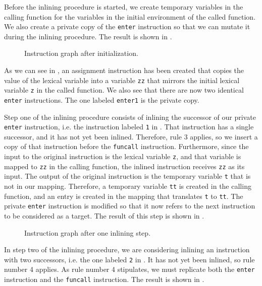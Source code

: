 Before the inlining procedure is started, we create temporary
variables in the calling function for the variables in the initial
environment of the called function.  We also create a private copy of
the \texttt{enter} instruction so that we can mutate it during the
inlining procedure.  The result is shown in .

\begin{figure}
\begin{center}
\end{center}
\caption{\label{fig42}
Instruction graph after initialization.}
\end{figure}

As we can see in , an assignment instruction has been
created that copies the value of the lexical variable into a variable
\texttt{zz} that mirrors the initial lexical variable \texttt{z} in
the called function.  We also see that there are now two identical
\texttt{enter} instructions.  The one labeled \texttt{enter1} is the
private copy.

Step one of the inlining procedure consists of inlining the successor
of our private \texttt{enter} instruction, i.e. the instruction
labeled \texttt{1} in .  That instruction has a single
successor, and it has not yet been inlined.  Therefore, rule 3
applies, so we insert a copy of that instruction before the
\texttt{funcall} instruction.  Furthermore, since the input to the
original instruction is the lexical variable \texttt{z}, and that
variable is mapped to \texttt{zz} in the calling function, the inlined
instruction receives \texttt{zz} as its input.  The output of the
original instruction is the temporary variable \texttt{t} that is not
in our mapping.  Therefore, a temporary variable \texttt{tt} is
created in the calling function, and an entry is created in the
mapping that translates \texttt{t} to \texttt{tt}.  The private
\texttt{enter} instruction is modified so that it now refers to the
next instruction to be considered as a target.  The result of this
step is shown in .

\begin{figure}
\begin{center}
\end{center}
\caption{\label{fig43}
Instruction graph after one inlining step.}
\end{figure}

In step two of the inlining procedure, we are considering inlining an
instruction with two successors, i.e. the one labeled \texttt{2} in
.  It has not yet been inlined, so rule number 4
applies.  As rule number 4 stipulates, we must replicate both the
\texttt{enter} instruction and the \texttt{funcall} instruction.  The
result is shown in .

